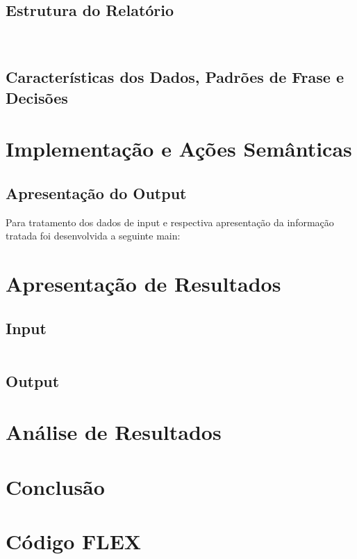 \documentclass{report}
\begin{document}
    \newpage
    \section*{Estrutura do Relatório} \
    

    
    \section*{Características dos Dados, Padr\~oes de Frase e Decisões}
    
    
    \chapter{Implementação e Ações Semânticas} \label{ae}

    
    \section{Apresentação do Output}
    Para tratamento dos dados de input e respectiva apresentação da informação tratada foi desenvolvida a seguinte main:
    

    
    \chapter{Apresentação de Resultados}

    \section{Input}
    \begin{verbatim}

    \end{verbatim}

    \newpage
    \section{Output}

    \chapter{Análise de Resultados}
   
    \chapter{Conclusão} \label{concl}
   
    \appendix
    \chapter{Código FLEX}

    \begin{verbatim}

    \end{verbatim}
    
    
    
    
    
\end{document}

